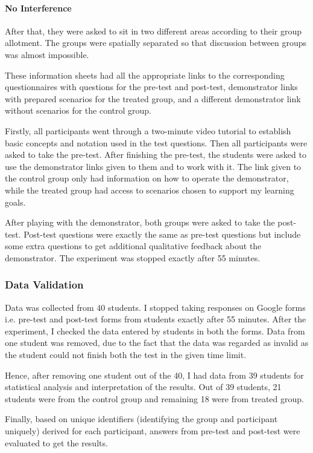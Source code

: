 \paragraph{No Interference} After that, they were asked to sit in two different areas according to their group allotment. The groups were spatially separated so that discussion between groups was almost impossible.

These information sheets had all the appropriate links to the corresponding questionnaires with questions for the pre-test and post-test, demonstrator links with prepared scenarios for the treated group, and a different demonstrator link without scenarios for the control group.

Firstly, all participants went through a two-minute video tutorial to establish basic concepts and notation used in the test questions. Then all participants were asked to take the pre-test. After finishing the pre-test, the students were asked to use the demonstrator links given to them and to work with it. The link given to the control group only had information on how to operate the demonstrator, while the treated group had access to scenarios chosen to support my learning goals. 

After playing with the demonstrator, both groups were asked to take the post-test. Post-test questions were exactly the same as pre-test questions but include some extra questions to get additional qualitative feedback about the demonstrator. The experiment was stopped exactly after 55 minutes.

\subsubsection{Data Validation}\label{subsubsec:datavalidation}
Data was collected from 40 students. I stopped taking responses on Google forms i.e. pre-test and post-test forms from students exactly after 55 minutes. After the experiment, I checked the data entered by students in both the forms. Data from one student was removed, due to the fact that the data was regarded as invalid as the student could not finish both the test in the given time limit.

Hence, after removing one student out of the 40, I had data from 39 students for statistical analysis and interpretation of the results. Out of 39 students, 21 students were from the control group and remaining 18 were from treated group.

Finally, based on unique identifiers (identifying the group and participant uniquely) derived for each participant, answers from pre-test and post-test were evaluated to get the results. 

